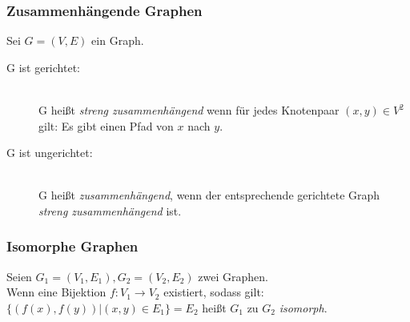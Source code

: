 \begin{frame}
	\frametitle{Zusammenhängende Graphen}
	\begin{definition}
    Sei $G = (V, E)$ ein Graph.
		\begin{description}
			\item[G ist gerichtet:] \hfill \\
			  G heißt \emph{streng zusammenhängend} wenn für jedes Knotenpaar $(x,y)\in V^2$ gilt: Es gibt einen Pfad von $x$ nach $y$.
			\item[G ist ungerichtet:] \hfill \\
        G heißt \emph{zusammenhängend}, wenn der entsprechende gerichtete Graph \emph{streng zusammenhängend} ist.
		\end{description}
	\end{definition}
\end{frame}

\begin{frame}
	\frametitle{Isomorphe Graphen}
	\begin{definition}
    Seien $G_1 = (V_1, E_1), G_2 = (V_2, E_2)$ zwei Graphen.\\
    Wenn eine Bijektion $f: V_1 \rightarrow V_2$ existiert, sodass gilt:\\
    $\{(f(x), f(y)) | (x, y) \in E_1\} = E_2$ heißt $G_1$ zu $G_2$ \emph{isomorph}.
	\end{definition}
\end{frame}


